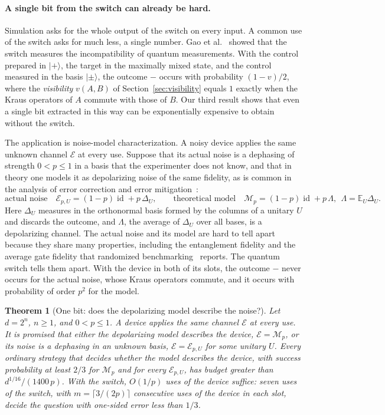 \documentclass[11pt,letterpaper]{article}
\newtheorem{theorem}{Theorem}
\theoremstyle{definition}\newtheorem{definition}[theorem]{Definition}
\newcommand{\E}{\mathbb E}
\newcommand{\ket}[1]{\lvert#1\rangle}
\newcommand{\id}{\operatorname{id}}
\begin{document}
\paragraph{A single bit from the switch can already be hard.}
Simulation asks for the whole output of the switch on every input. A
common use of the switch asks for much less, a single number. Gao et
al.~\cite{gao2023} showed that the switch measures the incompatibility
of quantum measurements. With the control prepared in $\ket+$, the
target in the maximally mixed state, and the control measured in the
basis $\ket\pm$, the outcome $-$ occurs with probability $(1-v)/2$, where the \emph{visibility} $v(A,B)$ of
Section~\ref{sec:visibility} equals $1$ exactly when the Kraus
operators of $A$ commute with those of $B$. Our third result shows that
even a single bit extracted in this way can be exponentially expensive
to obtain without the switch.

The application is noise-model characterization. A noisy device applies
the same unknown channel $\mathcal E$ at every use. Suppose that its
actual noise is a dephasing of strength $0<p\le1$ in a basis that the
experimenter does not know, and that in theory one models it as
depolarizing noise of the same fidelity, as is common in the analysis
of error correction and error
mitigation~\cite{fowler2012,cai2023}:
\[
 \text{actual noise}\quad\mathcal E_{p,U}=(1-p)\id+p\,\Delta_U ,
 \qquad
 \text{theoretical model}\quad\mathcal M_p=(1-p)\id+p\,\Lambda,
 \ \ \Lambda=\E_U\Delta_U .
\]
Here $\Delta_U$ measures in the orthonormal basis formed by the columns
of a unitary $U$ and discards the outcome, and $\Lambda$, the average
of $\Delta_U$ over all bases, is a depolarizing channel. The actual noise and its model are hard to tell apart because
they share many properties, including the entanglement fidelity and the
average gate fidelity that randomized
benchmarking~\cite{magesan2011} reports. The quantum switch tells them
apart. With the device in both of its slots, the outcome $-$ never
occurs for the actual noise, whose Kraus operators commute, and it
occurs with probability of order $p^2$ for the model.

\begin{theorem}[One bit: does the depolarizing model describe the noise?]\label{thm:c6}
Let $d=2^n$, $n\ge1$, and $0<p\le1$. A device applies the same channel
$\mathcal E$ at every use. It is promised that either the depolarizing
model describes the device, $\mathcal E=\mathcal M_p$, or its noise is
a dephasing in an unknown basis, $\mathcal E=\mathcal E_{p,U}$ for
some unitary $U$. Every ordinary strategy that decides whether the
model describes the device, with success probability at least $2/3$ for
$\mathcal M_p$ and for every $\mathcal E_{p,U}$, has budget greater
than $d^{1/16}/(1400\,p)$. With the
switch, $O(1/p)$ uses of the device suffice: seven uses of the switch,
with $m=\lceil3/(2p)\rceil$ consecutive uses of the device in each
slot, decide the question with one-sided error less than $1/3$.
\end{theorem}
\end{document}
